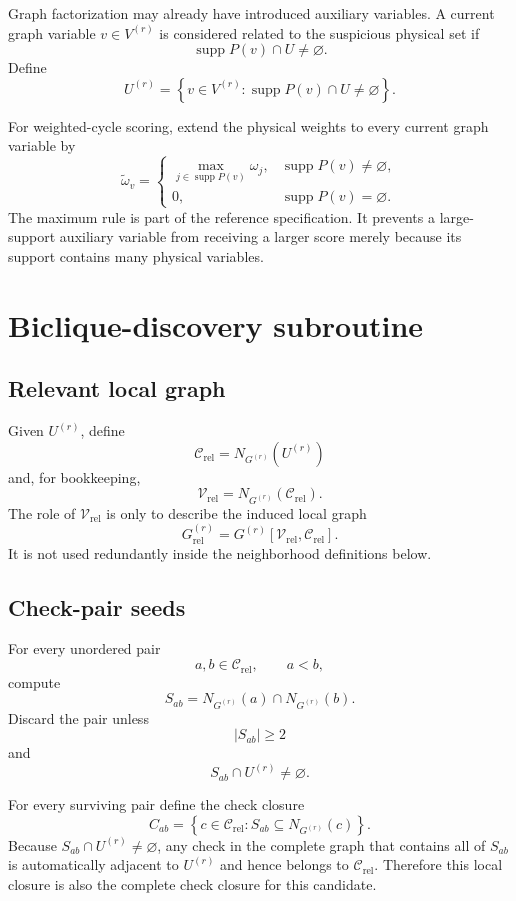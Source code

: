 \documentclass[11pt,a4paper]{article}
\newcommand{\supp}{\operatorname{supp}}
\newcommand{\Crel}{\mathcal C_{\mathrm{rel}}}
\newcommand{\Vrel}{\mathcal V_{\mathrm{rel}}}
\begin{document}
Graph factorization may already have introduced auxiliary variables. A current
graph variable $v\in V^{(r)}$ is considered related to the suspicious physical
set if
\[
\supp P(v)\cap U\ne\varnothing.
\]
Define
\[
U^{(r)}
=
\left\{
v\in V^{(r)}:
\supp P(v)\cap U\ne\varnothing
\right\}.
\]

For weighted-cycle scoring, extend the physical weights to every current graph
variable by
\[
\boxed{
\widetilde\omega_v
=
\begin{cases}
\max_{j\in\supp P(v)}\omega_j,
& \supp P(v)\ne\varnothing,\\
0,&\supp P(v)=\varnothing.
\end{cases}
}
\]
The maximum rule is part of the reference specification. It prevents a
large-support auxiliary variable from receiving a larger score merely because
its support contains many physical variables.

\section{Biclique-discovery subroutine}

\subsection{Relevant local graph}

Given $U^{(r)}$, define
\[
\boxed{
\Crel
=
N_{G^{(r)}}(U^{(r)})
}
\]
and, for bookkeeping,
\[
\Vrel
=
N_{G^{(r)}}(\Crel).
\]
The role of $\Vrel$ is only to describe the induced local graph
\[
G_{\mathrm{rel}}^{(r)}
=
G^{(r)}[\Vrel,\Crel].
\]
It is not used redundantly inside the neighborhood definitions below.

\subsection{Check-pair seeds}

For every unordered pair
\[
a,b\in\Crel,\qquad a<b,
\]
compute
\[
\boxed{
S_{ab}
=
N_{G^{(r)}}(a)\cap N_{G^{(r)}}(b).
}
\]
Discard the pair unless
\[
|S_{ab}|\ge2
\]
and
\[
S_{ab}\cap U^{(r)}\ne\varnothing.
\]

For every surviving pair define the check closure
\[
\boxed{
C_{ab}
=
\left\{
c\in\Crel:
S_{ab}\subseteq N_{G^{(r)}}(c)
\right\}.
}
\]
Because $S_{ab}\cap U^{(r)}\ne\varnothing$, any check in the complete graph
that contains all of $S_{ab}$ is automatically adjacent to $U^{(r)}$ and hence
belongs to $\Crel$. Therefore this local closure is also the complete check
closure for this candidate.
\end{document}
